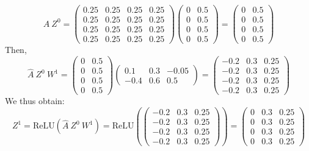 \documentclass[a4paper]{article}
\begin{document}
\[
\hat{A}\ Z^0 = \begin{pmatrix}
0.25 & 0.25 & 0.25 & 0.25 \\
0.25 & 0.25 & 0.25 & 0.25 \\
0.25 & 0.25 & 0.25 & 0.25 \\
0.25 & 0.25 & 0.25 & 0.25 \end{pmatrix} \begin{pmatrix}
        0 & 0.5 \\ 0 & 0.5 \\ 0 & 0.5 \\ 0 & 0.5
    \end{pmatrix}  = \begin{pmatrix}
        0 & 0.5 \\ 0 & 0.5 \\ 0 & 0.5 \\ 0 & 0.5
    \end{pmatrix}
\]
Then,
\[
\hat{A}\ Z^0\ W^1 = \begin{pmatrix}
        0 & 0.5 \\ 0 & 0.5 \\ 0 & 0.5 \\ 0 & 0.5
    \end{pmatrix} \begin{pmatrix}
        0.1 & 0.3 & -0.05 \\ -0.4 & 0.6 & 0.5
    \end{pmatrix} = \begin{pmatrix}
-0.2 & 0.3 & 0.25 \\
-0.2 & 0.3 & 0.25 \\
-0.2 & 0.3 & 0.25 \\
-0.2 & 0.3 & 0.25
\end{pmatrix}
\]
We thus obtain:
\[
Z^1 =  \text{ReLU}(\hat{A}\ Z^0\ W^1) = \text{ReLU}(\begin{pmatrix}
-0.2 & 0.3 & 0.25 \\
-0.2 & 0.3 & 0.25 \\
-0.2 & 0.3 & 0.25 \\
-0.2 & 0.3 & 0.25
\end{pmatrix}) = \begin{pmatrix}
0 & 0.3 & 0.25 \\
0 & 0.3 & 0.25 \\
0 & 0.3 & 0.25 \\
0 & 0.3 & 0.25
\end{pmatrix}
\]
\end{document}
